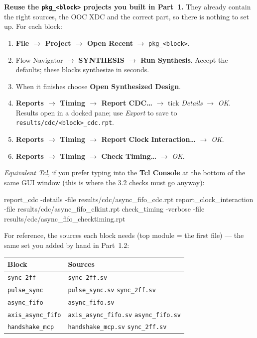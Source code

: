 \documentclass[10pt,a4paper]{article}
\newcommand{\code}[1]{\texttt{\small #1}}
\begin{document}
\textbf{Reuse the \code{pkg\_<block>} projects you built in Part~1.} They already
contain the right sources, the OOC XDC and the correct part, so there is nothing to
set up. For each block:

\begin{enumerate}[leftmargin=1.4em, itemsep=1pt]
\item \textbf{File $\to$ Project $\to$ Open Recent} $\to$ \code{pkg\_<block>}.
\item Flow Navigator $\to$ \textbf{SYNTHESIS $\to$ Run Synthesis}. Accept the
  defaults; these blocks synthesize in seconds.
\item When it finishes choose \textbf{Open Synthesized Design}.
\item \textbf{Reports $\to$ Timing $\to$ Report CDC\ldots} $\to$ tick
  \emph{Details} $\to$ \emph{OK}. Results open in a docked pane; use \emph{Export}
  to save to \code{results/cdc/<block>\_cdc.rpt}.
\item \textbf{Reports $\to$ Timing $\to$ Report Clock Interaction\ldots} $\to$
  \emph{OK}.
\item \textbf{Reports $\to$ Timing $\to$ Check Timing\ldots} $\to$ \emph{OK}.
\end{enumerate}

\emph{Equivalent Tcl}, if you prefer typing into the \textbf{Tcl Console} at the
bottom of the same GUI window (this is where the 3.2 checks must go anyway):

\begin{cmd}
report_cdc               -details -file results/cdc/async_fifo_cdc.rpt
report_clock_interaction -file results/cdc/async_fifo_clkint.rpt
check_timing   -verbose  -file results/cdc/async_fifo_checktiming.rpt
\end{cmd}

For reference, the sources each block needs (top module = the first file) --- the
same set you added by hand in Part~1.2:

\begin{center}
\small
\begin{tabular}{@{}ll@{}}
\toprule
\textbf{Block} & \textbf{Sources} \\
\midrule
\code{sync\_2ff}        & \code{sync\_2ff.sv} \\
\code{pulse\_sync}      & \code{pulse\_sync.sv} \quad \code{sync\_2ff.sv} \\
\code{async\_fifo}      & \code{async\_fifo.sv} \\
\code{axis\_async\_fifo} & \code{axis\_async\_fifo.sv} \quad \code{async\_fifo.sv} \\
\code{handshake\_mcp}   & \code{handshake\_mcp.sv} \quad \code{sync\_2ff.sv} \\
\bottomrule
\end{tabular}
\end{center}
\end{document}
